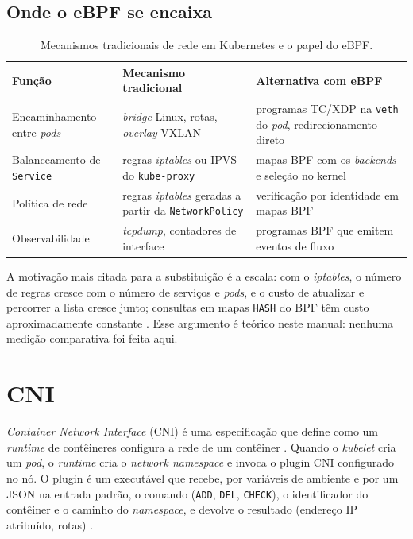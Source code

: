 \subsection*{Onde o eBPF se encaixa}

\begin{table}[h]
\centering
\caption{Mecanismos tradicionais de rede em Kubernetes e o papel do eBPF.}
\label{tab:k8s-ebpf}
\begin{tabular}{P{3.6cm} P{4.6cm} P{5.6cm}}
\hline
\textbf{Função} & \textbf{Mecanismo tradicional} & \textbf{Alternativa com eBPF} \\
\hline
Encaminhamento entre \textit{pods} & \textit{bridge} Linux, rotas, \textit{overlay} VXLAN & programas TC/XDP na \texttt{veth} do \textit{pod}, redirecionamento direto \\
Balanceamento de \texttt{Service} & regras \textit{iptables} ou IPVS do \texttt{kube-proxy} & mapas BPF com os \textit{backends} e seleção no kernel \\
Política de rede & regras \textit{iptables} geradas a partir da \texttt{NetworkPolicy} & verificação por identidade em mapas BPF \\
Observabilidade & \textit{tcpdump}, contadores de interface & programas BPF que emitem eventos de fluxo \\
\hline
\end{tabular}
\end{table}

A motivação mais citada para a substituição é a escala: com o \textit{iptables}, o
número de regras cresce com o número de serviços e \textit{pods}, e o custo de
atualizar e percorrer a lista cresce junto; consultas em mapas \texttt{HASH} do BPF
têm custo aproximadamente constante \cite{ciliumdocs, gregg2019}. Esse argumento é
teórico neste manual: nenhuma medição comparativa foi feita aqui.

\section{CNI}

\textit{Container Network Interface} (CNI) é uma especificação que define como um
\textit{runtime} de contêineres configura a rede de um contêiner \cite{cnispec}.
Quando o \textit{kubelet} cria um \textit{pod}, o \textit{runtime} cria o
\textit{network namespace} e invoca o plugin CNI configurado no nó. O plugin é um
executável que recebe, por variáveis de ambiente e por um JSON na entrada padrão, o
comando (\texttt{ADD}, \texttt{DEL}, \texttt{CHECK}), o identificador do contêiner e o
caminho do \textit{namespace}, e devolve o resultado (endereço IP atribuído, rotas)
\cite{cnispec}.

